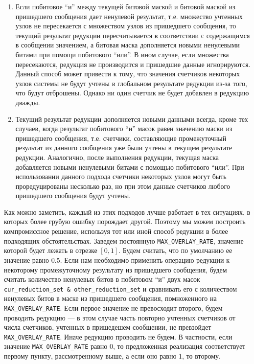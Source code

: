 \documentclass{article}
\theoremstyle{plain}
\theoremstyle{plain}
\theoremstyle{plain}
\theoremstyle{plain}
\theoremstyle{definition}
\theoremstyle{remark}
\theoremstyle{plain}
\begin{document}
\begin{enumerate}
    \item Если побитовое \enquote{и} между текущей битовой маской и битовой маской из пришедшего сообщения дает ненулевой результат, т.е. множество учтенных узлов не пересекается с множеством узлов из пришедшего сообщения, то текущий результат редукции пересчитывается в соответствии с содержащимся в сообщении значением, а битовая маска дополняется новыми ненулевыми битами при помощи побитового \enquote{или}. В ином случае, если множества пересекаются, редукция не производится и пришедшие данные игнорируются. Данный способ может привести к тому, что значения счетчиков некоторых узлов системы не будут учтены в глобальном результате редукции из-за того, что будут отброшены. Однако ни один счетчик не будет добавлен в редукцию дважды.
    
    \item Текущий результат редукции дополняется новыми данными всегда, кроме тех случаев, когда результат побитового \enquote{и} масок равен значению маски из пришедшего сообщения, т.е. счетчики, составляющие промежуточный результат из данного сообщения уже были учтены в текущем результате редукции. Аналогично, после выполнения редукции, текущая маска добавляется новыми ненулевыми битами с помощью побитового \enquote{или}. При использовании данного подхода счетчики некоторых узлов могут быть проредуцированы несколько раз, но при этом данные счетчиков любого пришедшего сообщения будут учтены.
\end{enumerate}

Как можно заметить, каждый из этих подходов лучше работает в тех ситуациях, в которых более грубую ошибку порождает другой. Поэтому мы можем построить компромиссное решение, используя тот или иной способ редукции в более подходящих обстоятельствах. Заведем постоянную \texttt{MAX\_OVERLAY\_RATE}, значение которой будет лежать в отрезке $[0, 1]$. Будем считать, что по умолчанию ее значение равно $0.5$. Если нам необходимо применить операцию редукции к некоторому промежуточному результату из пришедшего сообщения, будем считать количество ненулевых битов в побитовом \enquote{и} двух масок \texttt{cur\_reduction\_set \& other\_reduction\_set} и сравнивать его с количеством ненулевых битов в маске из пришедшего сообщения, помноженного на \texttt{MAX\_OVERLAY\_RATE}. Если первое значение не превосходит второго, будем проводить редукцию --- в этом случае часть повторно учтенных счетчиков от числа счетчиков, учтенных в пришедешем сообщении, не превзойдет \texttt{MAX\_OVERLAY\_RATE}. Иначе редукцию проводить не будем. В частности, если значение \texttt{MAX\_OVERLAY\_RATE} равно 0, то предложенная реализация соответствует первому пункту, рассмотренному выше, а если оно равно 1, то второму.
\end{document}
